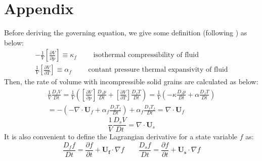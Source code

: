 \documentclass[preprint,12pt]{elsarticle}
\begin{document}
\section{\textsf{Appendix}}
%
%
Before deriving the governing equation, we give some definition (following \cite{Kashiwa}) as below:
%
%
\begin{gather}
-\frac{1}{V} \left[ \frac{\partial V}{\partial p} \right] \equiv \kappa_f \qquad \mbox{ isothermal compressibility of fluid} \\
\frac{1}{V} \left[ \frac{\partial V}{\partial T} \right] \equiv \alpha_f \qquad \mbox{ contant pressure thermal expansivity of fluid}
\end{gather}
%
%
Then, the rate of volume with incompressible solid grains are calculated as below:
%
%
\begin{equation}
\label{fluidvolumerate}
\begin{gathered}
   \frac{1}{V} \frac{D_f V}{Dt} = \frac{1}{V} \left( \left[ \frac{\partial V}{\partial p} \right] \frac{D_f p}{D t} + \left[ \frac{\partial V}{\partial T} \right] \frac{D_f T}{D t} \right) = \frac{1}{V} \left( -\kappa \frac{D_f p}{D t} + \alpha \frac{D_f T}{D t} \right) \\
   = -(-\nabla \cdot \pmb{U}_f + \alpha_f \frac{D_f T_f}{Dt}) + \alpha_f \frac{D_f T_f}{Dt} = \nabla \cdot \pmb{U}_f
\end{gathered}
\end{equation}
%
%
\begin{equation}
\label{solidvolumerate}
 \frac{1}{V} \frac{D_s V}{D t} = \nabla \cdot \pmb{U}_s
\end{equation}
%
%
It is also convenient to define the Lagrangian derivative for a state variable $f$ as:
%
%
\begin{equation}
\frac{D_f f}{Dt} =  \frac{\partial f}{\partial t} + \pmb{U_f} \cdot \nabla f \qquad
\frac{D_s f}{Dt} =  \frac{\partial f}{\partial t} + \pmb{U_s} \cdot \nabla f
\end{equation}
%
%
\end{document}
